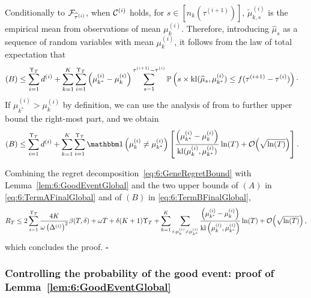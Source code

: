 Conditionally to $\mathcal{F}_{\widehat{\tau}^{(i)}}$, when $\mathcal{C}^{(i)}$ holds, for $s \in [n_k(\tau^{(i+1)})]$, $\widetilde{\mu}_{k,s}^{(i)}$ is the empirical mean from \iid{} observations of mean $\mu_k^{(i)}$.
Therefore, introducing $\widehat{\mu}_s$ as a sequence of \iid{} random variables with mean $\mu_k^{(i)}$, it follows from the law of total expectation that
\begin{align*}
    (B)& \leq \sum_{i=1}^{\Upsilon_T} d^{(i)}+\sum_{k=1}^K\sum_{i=1}^{\Upsilon_T} \left(\mu_{k^*}^{(i)} - \mu_k^{(i)}\right) \sum_{s=1}^{\tau^{(i+1)}-\tau^{(i)}}\mathbb{P}\left(s \times \mathrm{kl}(\widehat{\mu}_{s}, \mu_{k^*}^{(i)}) \leq f(\tau^{(i+1)} - \tau^{(i)})\right)\cdot
\end{align*}
%
If $\mu_{k^*}^{(i)} > \mu_k^{(i)}$ by definition, we can use the analysis of \klUCB{} from \cite{KLUCBJournal} to further upper bound the right-most part, and we obtain
%
\begin{align}\label{eq:6:TermBFinalGlobal}
    (B) & \leq \sum_{i=1}^{\Upsilon_T} d^{(i)}+\sum_{k=1}^K\sum_{i=1}^{\Upsilon_T} \indic\left(\mu_k^{(i)} \neq \mu_{k^*}^{(i)}\right)\left[ \frac{\left(\mu_{k^*}^{(i)} - \mu_k^{(i)}\right)}{\kl(\mu_k^{(i)},\mu_{k^*}^{(i)})}\log(T) + \bigO{\sqrt{\log(T)}}\right].
\end{align}

Combining the regret decomposition~\eqref{eq:6:GeneRegretBound} with Lemma~\ref{lem:6:GoodEventGlobal} and the two upper bounds of $(A)$ in \eqref{eq:6:TermAFinalGlobal} and of $(B)$ in \eqref{eq:6:TermBFinalGlobal},
\[R_T \leq 2\sum_{i=1}^{\Upsilon_T} \frac{4K}{\omega \left(\Delta^{(i)}\right)^2}\beta(T,\delta) +\omega T + \delta (K+1)\Upsilon_T  + \sum_{k=1}^{K}\sum_{i : \mu_k^{(i)} \neq \mu_{k^*}^{(i)}} \frac{\left( \mu_{k^*}^{(i)}-\mu_k^{(i)}\right)}{\mathrm{kl}\left(\mu_k^{(i)},\mu_{k^*}^{(i)}\right)}\ln(T) + \mathop{}\mathopen{}\mathcal{O}\mathopen{}\left(\sqrt{\ln(T)}\right),\]
which concludes the proof.
%
\hfill{}$\square$

\subsubsection{Controlling the probability of the good event: proof of Lemma~\ref{lem:6:GoodEventGlobal}}


